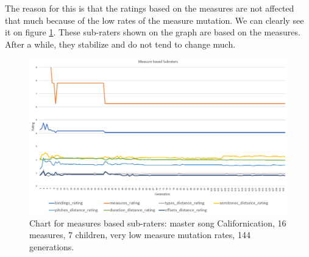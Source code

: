 \documentclass[a4paper]{article}
\begin{document}
The reason for this is that the ratings based on the measures are not affected that much because of the low rates of the measure mutation. We can clearly see it on figure \ref{fig:rhcp_1_m}. These sub-raters shown on the graph are based on the measures. After a while, they stabilize and do not tend to change much.


\begin{figure}[H]
	\advance\leftskip-1.5cm
	\includegraphics[width=1.2\textwidth]{Fotos/results/rhcp/measures_rating.png}
	\caption{Chart for measures based sub-raters: master song Californication, 16 measures, 7 children, very low measure mutation rates, 144 generations.}
	\label{fig:rhcp_1_m}
\end{figure}
\end{document}
